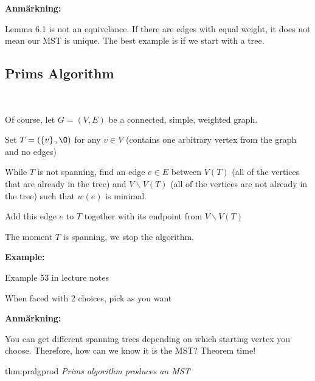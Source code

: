 \par\bigskip
\noindent\textbf{Anmärkning:}\par
\noindent Lemma 6.1 is not an equivelance. If there are edges with equal weight, it does not mean our MST is unique. The best example is if we start with a tree.
\newpage
\subsection{Prims Algorithm}\hfill\\\par
\noindent Of course, let $G = (V,E)$ be a connected, simple, weighted graph.
\par\bigskip
\noindent Set $T = (\left\{v\right\}, \O)$ for any $v\in V$ (contains one arbitrary vertex from the graph and no edges)
\par\bigskip
\noindent While $T$ is not spanning, find an edge $e\in E$ between $V(T)$ (all of the vertices that are already in the tree) and $V\backslash V(T)$ (all of the vertices are not already in the tree) such that $w(e)$ is minimal.
\par\bigskip
\noindent Add this edge $e$ to $T$ together with its endpoint from $V\backslash V(T)$
\par\bigskip
\noindent The moment $T$ is spanning, we stop the algorithm.
\par\bigskip
\noindent\textbf{Example:}\par
Example 53 in lecture notes
\par\bigskip
When faced with 2 choices, pick as you want
\par\bigskip
\noindent\textbf{Anmärkning:}\par
\noindent You can get different spanning trees depending on which starting vertex you choose. Therefore, how can we know it is the MST? Theorem time! 
\par\bigskip
\begin{theo}{thm:pralgprod}
  \textit{Prims algorithm produces an MST}
\end{theo}
\par\bigskip
